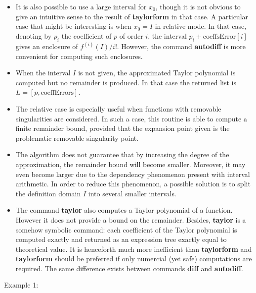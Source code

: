 \begin{itemize}
\item It is also possible to use a large interval for $x_0$, though it is not
   obvious to give an intuitive sense to the result of \textbf{taylorform} in that case.
   A particular case that might be interesting is when $x_0 = I$ in relative mode.
   In that case, denoting by $p_i$ the coefficient of $p$ of order $i$, the interval
   $p_i + \textrm{coeffsError}[i]$ gives an enclosure of $f^{(i)}(I)/i!$.
   However, the command \textbf{autodiff} is more convenient for computing such
   enclosures.

\item When the interval $I$ is not given, the approximated Taylor polynomial is
   computed but no remainder is produced. In that case the returned list
   is $L = \left[p, \textrm{coeffErrors}\right]$.

\item The relative case is especially useful when functions with removable
   singularities are considered. In such a case, this routine is able to compute
   a finite remainder bound, provided that the expansion point given is the
   problematic removable singularity point.

\item The algorithm does not guarantee that by increasing the degree of the
   approximation, the remainder bound will become smaller. Moreover, it may 
   even become larger due to the dependency phenomenon present with interval
   arithmetic. In order to reduce this phenomenon, a possible solution is to
   split the definition domain $I$ into several smaller intervals. 

\item The command \textbf{taylor} also computes a Taylor polynomial of a function. However
   it does not provide a bound on the remainder. Besides, \textbf{taylor} is a somehow
   symbolic command: each coefficient of the Taylor polynomial is computed
   exactly and returned as an expression tree exactly equal to theoretical
   value. It is henceforth much more inefficient than \textbf{taylorform} and \textbf{taylorform}
   should be preferred if only numercial (yet safe) computations are required.
   The same difference exists between commands \textbf{diff} and \textbf{autodiff}.
\end{itemize}
\noindent Example 1: 
